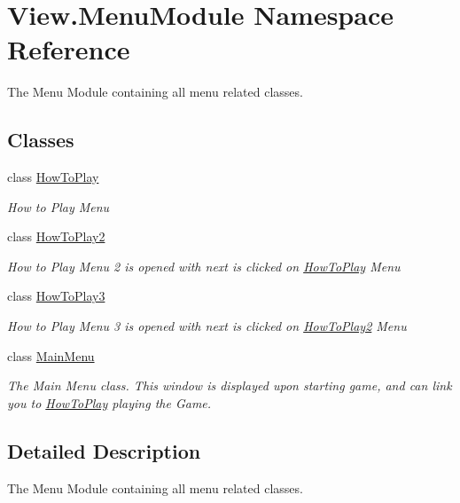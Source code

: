 \hypertarget{namespace_view_1_1_menu_module}{}\section{View.\+Menu\+Module Namespace Reference}
\label{namespace_view_1_1_menu_module}


The Menu Module containing all menu related classes.  


\subsection*{Classes}
\begin{DoxyCompactItemize}
\item 
class \hyperlink{class_view_1_1_menu_module_1_1_how_to_play}{How\+To\+Play}
\begin{DoxyCompactList}\small\item\em How to Play Menu \end{DoxyCompactList}\item 
class \hyperlink{class_view_1_1_menu_module_1_1_how_to_play2}{How\+To\+Play2}
\begin{DoxyCompactList}\small\item\em How to Play Menu 2 is opened with next is clicked on \hyperlink{class_view_1_1_menu_module_1_1_how_to_play}{How\+To\+Play} Menu \end{DoxyCompactList}\item 
class \hyperlink{class_view_1_1_menu_module_1_1_how_to_play3}{How\+To\+Play3}
\begin{DoxyCompactList}\small\item\em How to Play Menu 3 is opened with next is clicked on \hyperlink{class_view_1_1_menu_module_1_1_how_to_play2}{How\+To\+Play2} Menu \end{DoxyCompactList}\item 
class \hyperlink{class_view_1_1_menu_module_1_1_main_menu}{Main\+Menu}
\begin{DoxyCompactList}\small\item\em The Main Menu class. This window is displayed upon starting game, and can link you to \hyperlink{class_view_1_1_menu_module_1_1_how_to_play}{How\+To\+Play} playing the Game. \end{DoxyCompactList}\end{DoxyCompactItemize}


\subsection{Detailed Description}
The Menu Module containing all menu related classes. 

